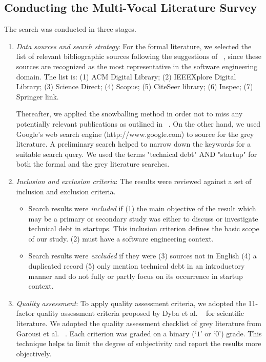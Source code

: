 \subsection{Conducting the Multi-Vocal Literature Survey}
The search was conducted in three stages.
\begin{enumerate}
\item \emph{Data sources and search strategy}: For the formal literature, we selected the list of relevant bibliographic sources following the suggestions of ~\cite{kitchenham2007guidelines}, since these sources are
recognized as the most representative in the software engineering domain.
The list is: (1) ACM Digital Library;  (2) IEEEXplore Digital Library; (3) Science Direct; (4) Scopus; (5) CiteSeer library; (6) Inspec; (7) Springer link.

Thereafter, we applied the snowballing method in order not to miss any potentially relevant publications as outlined in ~\cite{Wohlin2014/2601248.2601268}.
On the other hand, we used Google's web search engine (http://www.google.com) to source for the grey literature.
A preliminary search helped to narrow down the keywords for a suitable search query.
We used the terms "technical debt" AND "startup" for both the formal and the grey literature searches.

\item \emph{Inclusion and exclusion criteria}: The results were reviewed against a set of inclusion and exclusion criteria.

\begin{itemize}
\item Search results were \emph{included} if 
(1) the main objective of the result which may be a primary or secondary  study was either to discuss or investigate technical debt in startups.
This inclusion criterion defines the basic scope of our study.
(2) must have a software engineering context.

\item Search results were \emph{excluded} if they were 
(3) sources not in English
(4) a duplicated record 
(5) only mention technical debt in an introductory manner and do not fully or partly focus on its occurrence in startup context.
\end{itemize}

\item \emph{Quality assessment}: To apply quality assessment criteria, we adopted the 11-factor quality
assessment criteria proposed by Dyba et al. ~\cite{DYBA2008833} for scientific literature.
We adopted the quality assessment checklist of grey literature from Garousi et al. ~\cite{GAROUSI2019101}.
Each criterion was graded on a binary (`$1$' or `$0$') grade.
This technique helps to limit the degree of subjectivity and report the results more objectively. 
\end{enumerate}

